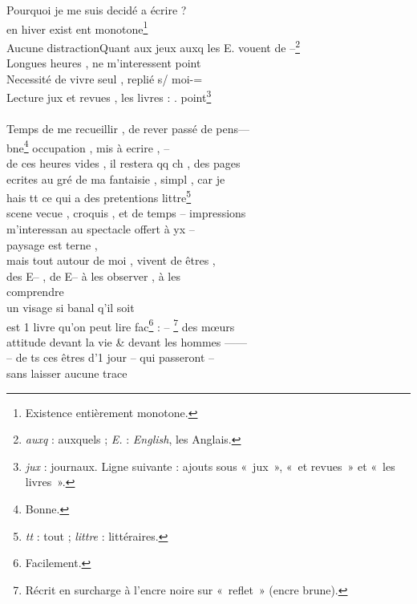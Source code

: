 \begin{LJlettre}
\noindent{}\quad Pourquoi je me suis decidé a écrire ?\\
en hiver exist ent monotone\footnote{Existence entièrement monotone.}\\
Aucune distraction\quad Quant aux jeux auxq les E. vouent de –\footnote{\textit{auxq} : auxquels ; \textit{E.} : \textit{English}, les Anglais.}\\
Longues heures , ne m'interessent point\\
Necessité de vivre seul , replié s/ moi-=\\
Lecture jux et revues , les livres : . point\footnote{\textit{jux} : journaux. Ligne suivante : ajouts sous «~jux~», «~et revues~» et «~les livres~».}\\
\hspace*{2em}\\
Temps de me recueillir , de rever passé de pens—\\
bne\footnote{Bonne.} occupation , mis à ecrire ,  – \\
 de ces heures vides , il restera qq ch  , des pages\\
ecrites au gré de ma fantaisie , simpl , car je\\
hais tt ce qui a des pretentions littre\footnote{\textit{tt} : tout ; \textit{littre} : littéraires.}\\
scene vecue , croquis , et de temps – impressions\\
m'interessan au spectacle offert à  yx –\\
paysage est terne ,\\
mais tout autour de moi , vivent de êtres ,\\
des E–  , de E–\quad {} à les observer , à les\\
comprendre\\
 un visage si banal q'il soit\\
est 1 livre qu'on peut lire fac\footnote{Facilement.} : – \footnote{Récrit en surcharge à l'encre noire sur «~reflet~» (encre brune).} des mœurs\\
attitude devant la vie \& devant les hommes ——\\
– de ts ces  êtres d'1 jour – qui passeront –\\
sans laisser aucune trace
\end{LJlettre}

